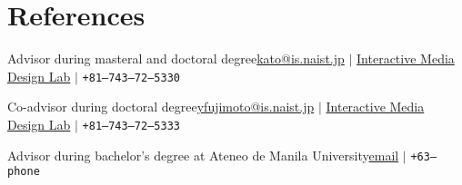 \section{References}
\cvSubHeadingListStart

{Advisor during masteral and doctoral degree}{\href{mailto:kato@is.naist.jp}{kato@is.naist.jp} $|$ \href{https://imdl.naist.jp/people/hirokazukato/}{Interactive Media Design Lab} $|$ \footnotesize\texttt{+81--743--72--5330}}
\vspace{5pt}

{Co-advisor during doctoral degree}{\href{mailto:yfujimoto@is.naist.jp}{yfujimoto@is.naist.jp} $|$ \href{https://imdl.naist.jp/people/yuichiro-fujimoto/}{Interactive Media Design Lab} $|$ \footnotesize\texttt{+81--743--72--5333}}
\vspace{5pt}

{Advisor during bachelor's degree at Ateneo de Manila University}{\href{mailto:email}{email} $|$ \footnotesize\texttt{+63--phone}}
\vspace{5pt}

\cvSubHeadingListEnd